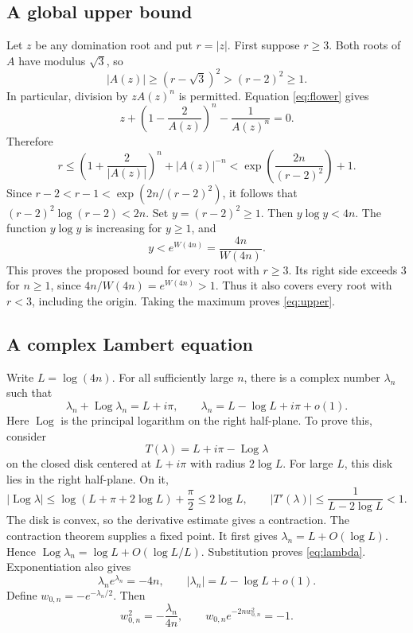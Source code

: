 \documentclass[11pt,a4paper]{article}
\newcommand{\Log}{\operatorname{Log}}
\begin{document}
\subsection{A global upper bound}
Let $z$ be any domination root and put $r=|z|$. First suppose $r\ge3$.
Both roots of $A$ have modulus $\sqrt3$, so
\[
 |A(z)|\ge(r-\sqrt3)^2>(r-2)^2\ge1.
\]
In particular, division by $zA(z)^n$ is permitted. Equation \eqref{eq:flower} gives
\[
 z+\left(1-\frac2{A(z)}\right)^n-\frac1{A(z)^n}=0.
\]
Therefore
\[
 r\le\left(1+\frac2{|A(z)|}\right)^n+|A(z)|^{-n}
 <\exp\left(\frac{2n}{(r-2)^2}\right)+1.
\]
Since $r-2<r-1<\exp(2n/(r-2)^2)$, it follows that
$(r-2)^2\log(r-2)<2n$. Set $y=(r-2)^2\ge1$.
Then $y\log y<4n$. The function $y\log y$ is increasing for $y\ge1$, and
\[
 y<e^{W(4n)}=\frac{4n}{W(4n)}.
\]
This proves the proposed bound for every root with $r\ge3$.
Its right side exceeds $3$ for $n\ge1$, since
$4n/W(4n)=e^{W(4n)}>1$. Thus it also covers every root with $r<3$,
including the origin. Taking the maximum proves \eqref{eq:upper}.

\subsection{A complex Lambert equation}
Write $L=\log(4n)$. For all sufficiently large $n$, there is a complex number
$\lambda_n$ such that
\begin{equation}\label{eq:lambda}
 \lambda_n+\Log\lambda_n=L+i\pi,\qquad
 \lambda_n=L-\log L+i\pi+o(1).
\end{equation}
Here $\Log$ is the principal logarithm on the right half-plane.
To prove this, consider
\[
 T(\lambda)=L+i\pi-\Log\lambda
\]
on the closed disk centered at $L+i\pi$ with radius $2\log L$.
For large $L$, this disk lies in the right half-plane. On it,
\[
 |\Log\lambda|\le\log(L+\pi+2\log L)+\frac\pi2\le2\log L,
 \qquad |T'(\lambda)|\le\frac1{L-2\log L}<1.
\]
The disk is convex, so the derivative estimate gives a contraction.
The contraction theorem supplies a fixed point. It first gives
$\lambda_n=L+O(\log L)$. Hence
$\Log\lambda_n=\log L+O(\log L/L)$.
Substitution proves \eqref{eq:lambda}. Exponentiation also gives
\[
 \lambda_ne^{\lambda_n}=-4n,\qquad
 |\lambda_n|=L-\log L+o(1).
\]
Define $w_{0,n}=-e^{-\lambda_n/2}$. Then
\begin{equation}\label{eq:wzero}
 w_{0,n}^2=-\frac{\lambda_n}{4n},\qquad
 w_{0,n}e^{-2nw_{0,n}^2}=-1.
\end{equation}
\end{document}
